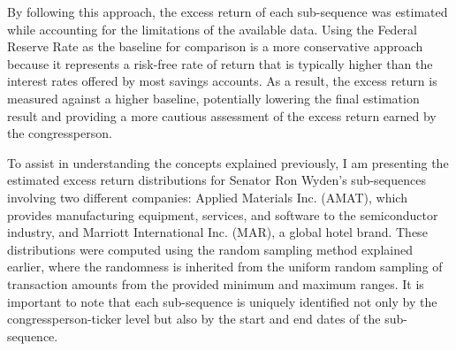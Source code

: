 \documentclass[15pt,letterpaper]{article}
\begin{document}
By following this approach, the excess return of each sub-sequence was estimated while accounting for the limitations of the available data. Using the Federal Reserve Rate as the baseline for comparison is a more conservative approach because it represents a risk-free rate of return \citep{fed1, fed2} that is typically higher than the interest rates offered by most savings accounts. As a result, the excess return is measured against a higher baseline, potentially lowering the final estimation result and providing a more cautious assessment of the excess return earned by the congressperson.

To assist in understanding the concepts explained previously, I am presenting the estimated excess return distributions for Senator Ron Wyden’s sub-sequences involving two different companies: Applied Materials Inc. (AMAT), which provides manufacturing equipment, services, and software to the semiconductor industry, and Marriott International Inc. (MAR), a global hotel brand. These distributions were computed using the random sampling method explained earlier, where the randomness is inherited from the uniform random sampling of transaction amounts from the provided minimum and maximum ranges.
It is important to note that each sub-sequence is uniquely identified not only by the congressperson-ticker level but also by the start and end dates of the sub-sequence.
\end{document}

